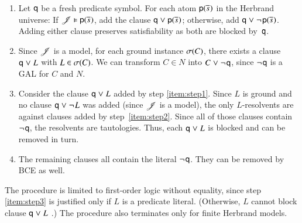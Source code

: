 \begin{enumerate}
   \item \label{item:step1}
   Let $\mathsf{q}$ be a fresh predicate symbol. For each atom
   $\mathsf{p}(\overline{s}_{})$ in the Herbrand universe: If
   $\mathscr{J} \vDash \mathsf{p}(\overline{s}_{})$, add the clause $\mathsf{q} \mathrel{\lor}
   \mathsf{p}(\overline{s}_{})$; otherwise, add %
   $\mathsf{q} \mathrel{\lor} \neg{\kern.2ex \mathsf{p}(\overline{s}_{})}$. Adding either clause
   preserves satisfiability as both are blocked by~$\mathsf{q}$.
   \smallskip
   \item \label{item:step2}
   Since $\mathscr{J}$ is a model, for each ground instance $\sigma(C)$, there exists a clause
   $\mathsf{q} \mathrel{\lor} L$ with $L \in \sigma(C)$. We can transform $C \in N$ into
   $C \mathrel{\lor} \neg{\kern.2ex \mathsf{q}}$, since $\neg{\kern.2ex \mathsf{q}}$ is a GAL for $C$ and $N$.

   \smallskip
   \item \label{item:step3}
   Consider the clause $\mathsf{q} \mathrel{\lor} L$ added by step \ref{item:step1}. Since
   $L$ is ground and no clause $\mathsf{q} \mathrel{\lor} \neg{\kern.2ex L}$ was added (since $\mathscr{J}$ is a
   model), the only $L$-resolvents are against clauses added by step~\ref{item:step2}.
   Since all of those clauses contain $\neg{\kern.2ex \mathsf{q}}$, the resolvents are tautologies. 
   Thus, each $\mathsf{q} \mathrel{\lor} L$ is blocked and can be removed in turn.

   \smallskip
   \item The remaining clauses all contain the literal $\neg{\kern.2ex \mathsf{q}}$. They can be removed
   by BCE as well.
\end{enumerate}


The procedure is limited to first-order logic without equality, since step
\ref{item:step3} is justified only if $L$ is a predicate literal. (Otherwise,
$L$ cannot block clause $\mathsf{q} \mathrel{\lor} L$ \cite{ksstb-2017-blockedfol}.) The
procedure also terminates only for finite Herbrand models. 


